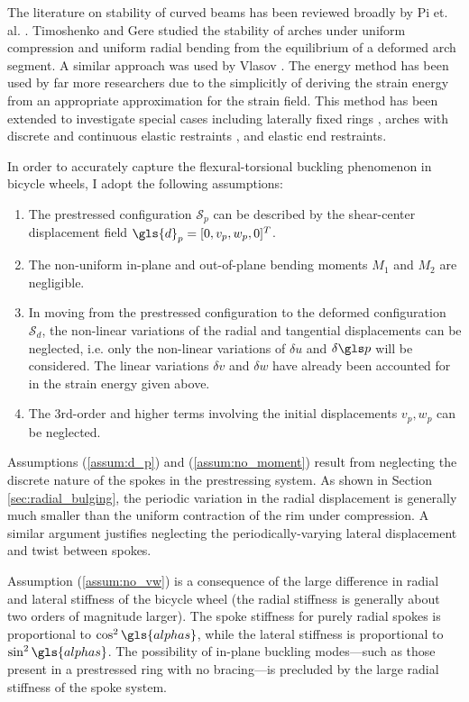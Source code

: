 \documentclass[\rootdir/thesis.tex]{subfiles}
\begin{document}
The literature on stability of curved beams has been reviewed broadly by Pi et. al. \cite{Pi2005}. Timoshenko and Gere \cite{Timoshenko1961} studied the stability of arches under uniform compression and uniform radial bending from the equilibrium of a deformed arch segment. A similar approach was used by Vlasov \cite{Vlasov1961}. The energy method has been used by far more researchers \cite{Yoo1982,Trahair1987,Pi1992,Kang1994,Pi1995,Lim2004,Ryu2012} due to the simplicitly of deriving the strain energy from an appropriate approximation for the strain field. This method has been extended to investigate special cases including laterally fixed rings \cite{Teng1988b}, arches with discrete and continuous elastic restraints \cite{Pi2002,Bradford2002}, and elastic end restraints.

In order to accurately capture the flexural-torsional buckling phenomenon in bicycle wheels, I adopt the following assumptions:
\begin{enumerate}
	\item{The prestressed configuration $\mathcal{S}_p$ can be described by the shear-center displacement field $\gls{d}_p = [0, v_p, w_p, 0]^T$.}\label{assum:d_p}
	\item{The non-uniform in-plane and out-of-plane bending moments $M_1$ and $M_2$ are negligible.}\label{assum:no_moment}
	\item{In moving from the prestressed configuration to the deformed configuration $\mathcal{S}_d$, the non-linear variations of the radial and tangential displacements can be neglected, i.e. only the non-linear variations of $\delta u$ and $\delta\p$ will be considered. The linear variations $\delta v$ and $\delta w$ have already been accounted for in the strain energy given above.}\label{assum:no_vw}
	\item{The 3rd-order and higher terms involving the initial displacements $v_p,w_p$ can be neglected.}\label{assum:no_prebuckle}
\end{enumerate}

Assumptions (\ref{assum:d_p}) and (\ref{assum:no_moment}) result from neglecting the discrete nature of the spokes in the prestressing system. As shown in Section \ref{sec:radial_bulging}, the periodic variation in the radial displacement is generally much smaller than the uniform contraction of the rim under compression. A similar argument justifies neglecting the periodically-varying lateral displacement and twist between spokes.

Assumption (\ref{assum:no_vw}) is a consequence of the large difference in radial and lateral stiffness of the bicycle wheel (the radial stiffness is generally about two orders of magnitude larger). The spoke stiffness for purely radial spokes is proportional to $\cos^2{\gls{alphas}}$, while the lateral stiffness is proportional to $\sin^2{\gls{alphas}}$. The possibility of in-plane buckling modes---such as those present in a prestressed ring with no bracing---is precluded by the large radial stiffness of the spoke system.
\end{document}
